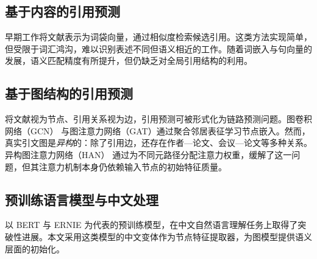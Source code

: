 \subsection{基于内容的引用预测}
早期工作将文献表示为词袋向量，通过相似度检索候选引用\cite{kipf2017}。这类方法实现简单，但受限于词汇鸿沟，难以识别表述不同但语义相近的工作。随着词嵌入与句向量的发展，语义匹配精度有所提升，但仍缺乏对全局引用结构的利用。

\subsection{基于图结构的引用预测}
将文献视为节点、引用关系视为边，引用预测可被形式化为链路预测问题。图卷积网络（GCN）\cite{kipf2017} 与图注意力网络（GAT）通过聚合邻居表征学习节点嵌入。然而，真实引文图是\emph{异构}的：除了引用边，还存在作者—论文、会议—论文等多种关系。异构图注意力网络（HAN）\cite{wang2019} 通过为不同元路径分配注意力权重，缓解了这一问题，但其注意力机制本身仍依赖输入节点的初始特征质量。

\subsection{预训练语言模型与中文处理}
以 BERT\cite{devlin2019} 与 ERNIE\cite{sun2020} 为代表的预训练模型，在中文自然语言理解任务上取得了突破性进展。本文采用这类模型的中文变体作为节点特征提取器，为图模型提供语义层面的初始化。
